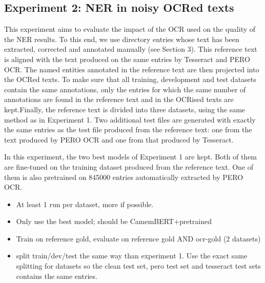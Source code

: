 \subsection{Experiment 2: NER in noisy OCRed texts}
This experiment aims to evaluate the impact of the OCR used on the quality of the NER results. To this end, we use directory entries whose text has been extracted, corrected and annotated manually (see Section 3). This reference text is aligned with the text produced on the same entries by Tesseract and PERO OCR. The named entities annotated in the reference text are then projected into the OCRed texts. To make sure that all training, development and test datasets contain the same annotations, only the entries for which the same number of annotations are found in the reference text and in the OCRised texts are kept.Finally, the reference text is divided into three datasets, using the same method as in Experiment 1. Two additional test files are generated with exactly the same entries as the test file produced from the reference text: one from the text produced by PERO OCR and one from that produced by Tesseract.

In this experiment, the two best models of Experiment 1 are kept. Both of them are fine-tuned on the training dataset produced from the reference text. One of them is also pretrained on 845000 entries automatically extracted by PERO OCR. 



\begin{itemize}
\item At least 1 run per dataset, more if possible.
\item Only use the best model; should be CamemBERT+pretrained
\item Train on reference gold, evaluate on reference gold AND ocr-gold (2 datasets)
\item split train/dev/test the same way than experiment 1. Use the exact same splitting for datasets so the clean test set, pero test set and tesseract test sets contains the same entries.
\end{itemize}
 
 




